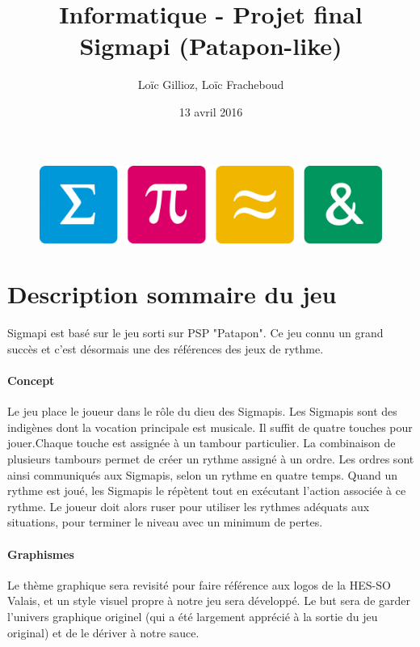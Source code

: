 \documentclass[a4paper , 10pt]{article}
\author{Loïc Gillioz, Loïc Fracheboud}
\title{Informatique - Projet final \\ \Huge Sigmapi (Patapon-like)}
\date{13 avril 2016}
\begin{document}
\maketitle
\begin{figure}[!h]
\centering
\includegraphics[scale=0.15]{images/icones}
\end{figure}
\pagebreak

\section{Description sommaire du jeu}
Sigmapi est basé sur le jeu sorti sur PSP "Patapon". Ce jeu connu un grand succès et c'est désormais une des références des jeux de rythme.
\paragraph*{Concept}
Le jeu place le joueur dans le rôle du dieu des Sigmapis. Les Sigmapis sont des indigènes dont la vocation principale est musicale.
Il suffit de quatre touches pour jouer.Chaque touche est assignée à un tambour particulier. La combinaison de plusieurs tambours permet de créer un rythme assigné à un ordre. Les ordres sont ainsi communiqués aux Sigmapis, selon un rythme en quatre temps. Quand un rythme est joué, les Sigmapis le répètent tout en exécutant l'action associée à ce rythme. Le joueur doit alors ruser pour utiliser les rythmes adéquats aux situations, pour terminer le niveau avec un minimum de pertes.
\paragraph*{Graphismes}
Le thème graphique sera revisité pour faire référence aux logos de la HES-SO Valais, et un style visuel propre à notre jeu sera développé. Le but sera de garder l'univers graphique originel (qui a été largement apprécié à la sortie du jeu original) et de le dériver à notre sauce.
\end{document}

